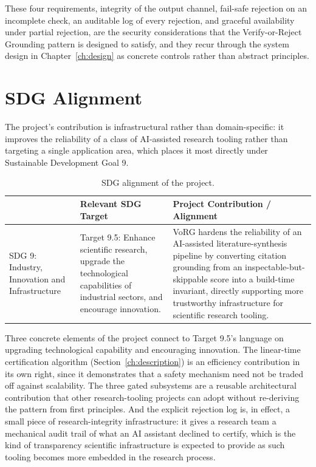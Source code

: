 \documentclass[12pt,a4paper]{report}
\newcommand{\headrow}{\rowcolor{navy}}
\newcommand{\hd}[1]{{\color{white}\bfseries #1}}
\begin{document}
These four requirements, integrity of the output channel, fail-safe
rejection on an incomplete check, an auditable log of every rejection, and
graceful availability under partial rejection, are the security
considerations that the Verify-or-Reject Grounding pattern is designed to
satisfy, and they recur through the system design in Chapter~\ref{ch:design}
as concrete controls rather than abstract principles.

\section{SDG Alignment}
The project's contribution is infrastructural rather than domain-specific: it
improves the reliability of a class of AI-assisted research tooling rather
than targeting a single application area, which places it most directly under
Sustainable Development Goal 9.

\begin{table}[H]
\centering
\caption{SDG alignment of the project.}
\label{tab:sdg}
\begin{tabular}{@{}p{2.6cm}p{5.0cm}p{6.0cm}@{}}
\toprule
\headrow \hd{SDG No. \& Goal} & \hd{Relevant SDG Target} & \hd{Project Contribution / Alignment} \\
\midrule
SDG 9: Industry, Innovation and Infrastructure &
Target 9.5: Enhance scientific research, upgrade the technological capabilities
of industrial sectors, and encourage innovation. &
VoRG hardens the reliability of an AI-assisted literature-synthesis pipeline by
converting citation grounding from an inspectable-but-skippable score into a
build-time invariant, directly supporting more trustworthy infrastructure for
scientific research tooling. \\
\bottomrule
\end{tabular}
\end{table}

Three concrete elements of the project connect to Target 9.5's language on
upgrading technological capability and encouraging innovation. The
linear-time certification algorithm (Section~\ref{ch:description}) is an
efficiency contribution in its own right, since it demonstrates that a safety
mechanism need not be traded off against scalability. The three gated
subsystems are a reusable architectural contribution that other
research-tooling projects can adopt without re-deriving the pattern from
first principles. And the explicit rejection log is, in effect, a small piece
of research-integrity infrastructure: it gives a research team a mechanical
audit trail of what an AI assistant declined to certify, which is the kind of
transparency scientific infrastructure is expected to provide as such tooling
becomes more embedded in the research process.
\end{document}
